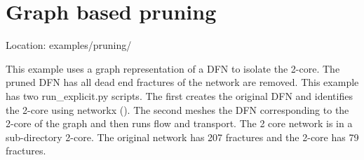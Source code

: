 \documentclass[letterpaper,10pt,english]{sphinxmanual}
\begin{document}
\begin{DUlineblock}{0em}
\item[] 
\item[] 
\end{DUlineblock}

\begin{figure}[htbp]
\centering

\noindent{}
\end{figure}

\begin{DUlineblock}{0em}
\item[] 
\item[] 
\end{DUlineblock}

\begin{figure}[htbp]
\centering

\noindent{}
\end{figure}


\section{Graph based pruning}
\label{\detokenize{examples:graph-based-pruning}}
Location: examples/pruning/

This example uses a graph representation of a DFN to isolate the 2-core. The pruned DFN has all dead end fractures of the network are removed. This example has two run\_explicit.py scripts. The first creates the original DFN and identifies the 2-core using networkx (). The second meshes the DFN corresponding to the 2-core of the graph and then runs flow and transport. The 2 core network is in a sub-directory 2-core. The original network has 207 fractures and the 2-core has 79 fractures.

\begin{figure}[htbp]
\centering
\capstart

\noindent{}
\caption{}\label{\detokenize{examples:id9}}\end{figure}

\begin{figure}[htbp]
\centering
\capstart

\noindent{}
\caption{}\label{\detokenize{examples:id10}}\end{figure}
\end{document}

